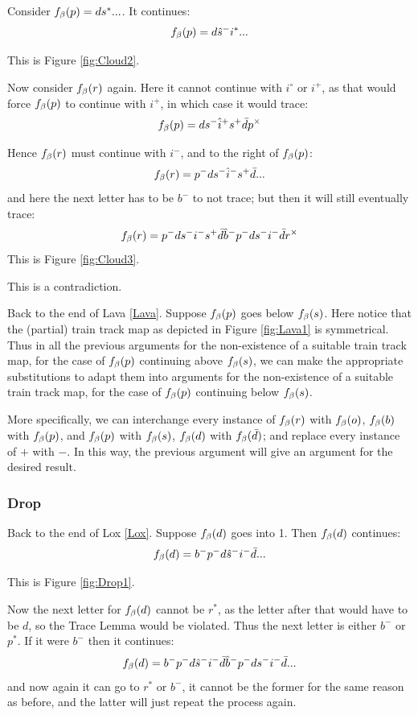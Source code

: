 Consider $f_\beta(p) = d s^*...$. It continues:
\[
f_\beta(p) = d \hat{s}^- i^*...
\]

This is Figure \ref{fig:Cloud2}.

Now consider $f_\beta(r)$ again. Here it cannot continue with $i^\circ$ or $i^+$, as that would force $f_\beta(p)$ to continue with $i^+$, in which case it would trace:
\[
f_\beta(p) = d s^- \hat{i}^+ s^+ \bar{d} p^\times
\]

Hence $f_\beta(r)$ must continue with $i^-$, and to the right of $f_\beta(p)$:
\[
f_\beta(r) = p^- d s^- \hat{i}^- s^+ \bar{d}...
\]
and here the next letter has to be $b^-$ to not trace; but then it will still eventually trace:
\[
f_\beta(r) = p^- d s^- i^- s^+ \bar{d} \hat{b}^- p^- d s^- i^- \bar{d} r^\times
\]
This is Figure \ref{fig:Cloud3}.

This is a contradiction.

Back to the end of Lava \ref{Lava}. Suppose $f_\beta(p)$ goes below $f_\beta(s)$. Here notice that the (partial) train track map as depicted in Figure \ref{fig:Lava1} is symmetrical. Thus in all the previous arguments for the non-existence of a suitable train track map, for the case of $f_\beta(p)$ continuing above $f_\beta(s)$, we can make the appropriate substitutions to adapt them into arguments for the non-existence of a suitable train track map, for the case of $f_\beta(p)$ continuing below $f_\beta(s)$.

More specifically, we can interchange every instance of $f_\beta(r)$ with $f_\beta(o)$, $f_\beta(b)$ with $f_\beta(p)$, and $f_\beta(p)$ with $f_\beta(s)$, $f_\beta(d)$ with $f_\beta(\bar{d})$; and replace every instance of $+$ with $-$. In this way, the previous argument will give an argument for the desired result.

\subsubsection{Drop}\label{Drop}
Back to the end of Lox \ref{Lox}. Suppose $f_\beta(d)$ goes into 1. Then $f_\beta(d)$ continues:
\[
f_\beta(d) = b^- p^- d \hat{s}^- i^- \bar{d}...
\]

This is Figure \ref{fig:Drop1}.

Now the next letter for $f_\beta(d)$ cannot be $r^*$, as the letter after that would have to be $d$, so the Trace Lemma would be violated. Thus the next letter is either $b^-$ or $p^*$. If it were $b^-$ then it continues:
\[
f_\beta(d) = b^- p^- d \hat{s}^- i^- \bar{d} \hat{b}^- p^- d s^- i^- \bar{d}...
\]
and now again it can go to $r^*$ or $b^-$, it cannot be the former for the same reason as before, and the latter will just repeat the process again.

